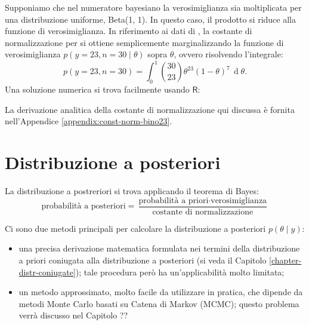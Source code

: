 \documentclass[
  10pt,
  italian,
  a4paper,
  extrafontsizes,onecolumn,openright
  ]{memoir}
\newenvironment{Shaded}{\begin{snugshade}}{\end{snugshade}}
\newcommand{\AttributeTok}[1]{\textcolor[rgb]{0.77,0.63,0.00}{#1}}
\newcommand{\CommentTok}[1]{\textcolor[rgb]{0.56,0.35,0.01}{\textit{#1}}}
\newcommand{\ControlFlowTok}[1]{\textcolor[rgb]{0.13,0.29,0.53}{\textbf{#1}}}
\newcommand{\DecValTok}[1]{\textcolor[rgb]{0.00,0.00,0.81}{#1}}
\newcommand{\FunctionTok}[1]{\textcolor[rgb]{0.00,0.00,0.00}{#1}}
\newcommand{\NormalTok}[1]{#1}
\newcommand{\OtherTok}[1]{\textcolor[rgb]{0.56,0.35,0.01}{#1}}
\newcommand{\SpecialCharTok}[1]{\textcolor[rgb]{0.00,0.00,0.00}{#1}}
\providecommand{\tightlist}{%
  \setlength{\itemsep}{0pt}\setlength{\parskip}{0pt}}
\newcommand{\R}{\textsf{R}} %
\theoremstyle{definition}
\theoremstyle{definition}
\theoremstyle{definition}
\theoremstyle{definition}
\theoremstyle{remark}
\begin{document}
Supponiamo che nel numeratore bayesiano la verosimiglianza sia moltiplicata per una distribuzione uniforme, Beta(1, 1). In questo caso, il prodotto si riduce alla funzione di verosimiglianza. In riferimento ai dati di \textcite{zetschefuture2019}, la costante di normalizzazione per si ottiene semplicemente marginalizzando la funzione di verosimiglianza \(p(y = 23, n = 30 \mid \theta)\) sopra \(\theta\), ovvero risolvendo l'integrale:
\begin{equation}
p(y = 23, n = 30) = \int_0^1 \binom{30}{23} \theta^{23} (1-\theta)^{7} \,\operatorname {d}\!\theta.
\label{eq:intlikebino23}
\end{equation}
\noindent
Una soluzione numerica si trova facilmente usando \(\R\):

\begin{Shaded}
\end{Shaded}

\noindent
La derivazione analitica della costante di normalizzazione qui discussa è fornita nell'Appendice \ref{appendix:const-norm-bino23}.

\hypertarget{distribuzione-a-posteriori}{%
\section{Distribuzione a posteriori}\label{distribuzione-a-posteriori}}

La distribuzione a postreriori si trova applicando il teorema di Bayes:
\[
\text{probabilità a posteriori} = \frac{\text{probabilità a priori} \cdot \text{verosimiglianza}}{\text{costante di normalizzazione}}
\]

Ci sono due metodi principali per calcolare la distribuzione a posteriori \(p(\theta \mid y)\):

\begin{itemize}
\tightlist
\item
  una precisa derivazione matematica formulata nei termini della distribuzione a priori coniugata alla distribuzione a posteriori (si veda il Capitolo \ref{chapter-distr-coniugate}); tale procedura però ha un'applicabilità molto limitata;
\item
  un metodo approssimato, molto facile da utilizzare in pratica, che dipende da metodi Monte Carlo basati su Catena di Markov (MCMC); questo problema verrà discusso nel Capitolo ??
\end{itemize}
\end{document}

